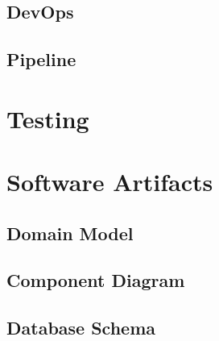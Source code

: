 \subsection{DevOps}
\subsection{Pipeline}

\section{Testing}

\section{Software Artifacts}
\subsection{Domain Model}
\subsection{Component Diagram}
\subsection{Database Schema}
